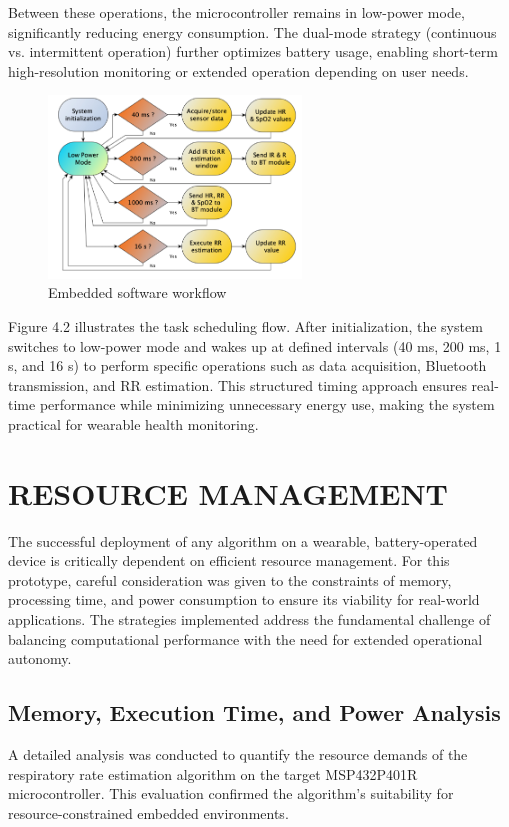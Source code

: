 \documentclass[12pt,a4paper]{report}
\begin{document}
Between these operations, the microcontroller remains in low-power mode, significantly reducing energy consumption. The dual-mode strategy (continuous vs. intermittent operation) further optimizes battery usage, enabling short-term high-resolution monitoring or extended operation depending on user needs.

\begin{figure}[H]
    \centering
    \includegraphics[width=0.6\textwidth]{softaew architecture.png}
    \caption{Embedded software workflow}
    \label{5.10cm}
\end{figure}

Figure 4.2 illustrates the task scheduling flow. After initialization, the system switches to low-power mode and wakes up at defined intervals (40 ms, 200 ms, 1 s, and 16 s) to perform specific operations such as data acquisition, Bluetooth transmission, and RR estimation. This structured timing approach ensures real-time performance while minimizing unnecessary energy use, making the system practical for wearable health monitoring.

\section{\large{RESOURCE MANAGEMENT}}

The successful deployment of any algorithm on a wearable, battery-operated device is critically dependent on efficient resource management. For this prototype, careful consideration was given to the constraints of memory, processing time, and power consumption to ensure its viability for real-world applications. The strategies implemented address the fundamental challenge of balancing computational performance with the need for extended operational autonomy.

\subsection{Memory, Execution Time, and Power Analysis}
A detailed analysis was conducted to quantify the resource demands of the respiratory rate estimation algorithm on the target MSP432P401R microcontroller. This evaluation confirmed the algorithm's suitability for resource-constrained embedded environments.
\end{document}
